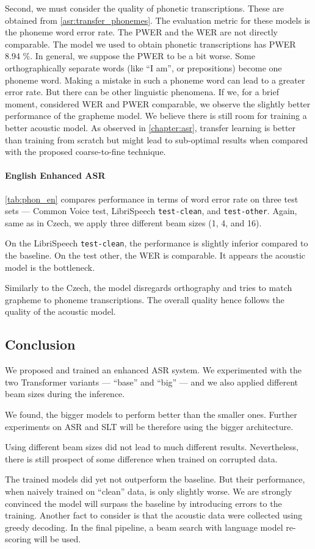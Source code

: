 Second, we must consider the quality of phonetic transcriptions. These are obtained from \cref{asr:transfer_phonemes}. The evaluation metric for these models is the phoneme word error rate. The PWER and the WER are not directly comparable. The model we used to obtain phonetic transcriptions has PWER 8.94 \%. In general, we suppose the PWER to be a bit worse. Some orthographically separate words (like ``I am'', or prepositions) become one phoneme word. Making a mistake in such a phoneme word can lead to a greater error rate. But there can be other linguistic phenomena. If we, for a brief moment, considered WER and PWER comparable, we observe the slightly better performance of the grapheme model. We believe there is still room for training a better acoustic model. As observed in \cref{chapter:asr}, transfer learning is better than training from scratch but might lead to sub-optimal results when compared with the proposed coarse-to-fine technique. 

\paragraph{English Enhanced ASR}
\cref{tab:phon_en} compares performance in terms of word error rate on three test sets --- Common Voice test, LibriSpeech \texttt{test-clean}, and \texttt{test-other}. Again, same as in Czech, we apply three different beam sizes (1, 4, and 16).

On the LibriSpeech \texttt{test-clean}, the performance is slightly inferior compared to the baseline. On the test other, the WER is comparable. It appears the acoustic model is the bottleneck. 

Similarly to the Czech, the model disregards orthography and tries to match grapheme to phoneme transcriptions. The overall quality hence follows the quality of the acoustic model.

\subsection{Conclusion}
\label{easr:conclusion}
We proposed and trained an enhanced ASR system. We experimented with the two Transformer variants --- ``base'' and ``big'' --- and we also applied different beam sizes during the inference. 

We found, the bigger models to perform better than the smaller ones. Further experiments on ASR and SLT will be therefore using the bigger architecture.

Using different beam sizes did not lead to much different results. Nevertheless, there is still prospect of some difference when trained on corrupted data.

The trained models did yet not outperform the baseline. But their performance, when naively trained on ``clean'' data, is only slightly worse. We are strongly convinced the model will surpass the baseline by introducing errors to the training. Another fact to consider is that the acoustic data were collected using greedy decoding. In the final pipeline, a beam search with language model re-scoring will be used. 
